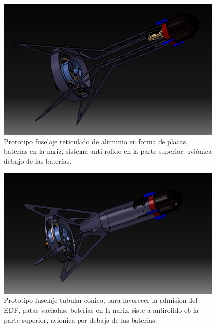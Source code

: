 \begin{figure}[htb]
    \centering
    \includegraphics[width=\linewidth]{fig/design/2}
    \caption{Prototipo fuselaje reticulado de aluminio en forma de placas, baterías en la nariz, sistema anti
    rolido en la parte superior, aviónica debajo de las baterías.}
    \label{fig:design/2}
\end{figure}

\begin{figure}[htb]
    \centering
    \includegraphics[width=\linewidth]{fig/design/3}
    \caption{Prototipo fuselaje tubular conico, para favorecer la admision del EDF, patas vaciadas, beterias en la nariz, siste a antirolido eb la parte superior,  avionica por debajo de las baterias.}
    \label{fig:design/3}
\end{figure}

